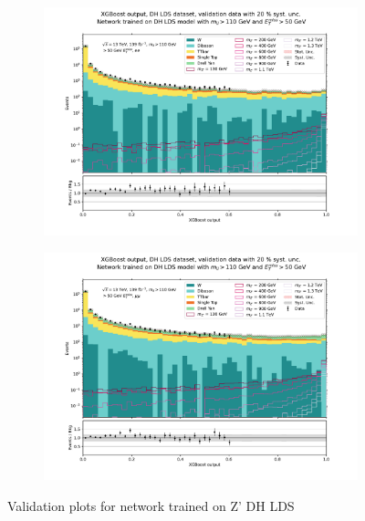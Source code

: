 \documentclass[12pt, a4paper]{book}
\begin{document}
\begin{figure}[!ht]
	\centering
	\begin{subfigure}[b]{0.49\textwidth}
      \centering
      \includegraphics[width=1\textwidth]{XGBoost/DH_LDS/VAL_ee.pdf}
      \end{subfigure}
   \hfill
   \begin{subfigure}[b]{0.49\textwidth}
      \centering
      \includegraphics[width=1\textwidth]{XGBoost/DH_LDS/VAL_uu.pdf}
      \end{subfigure}
   \caption{Validation plots for network trained on Z' DH LDS}\label{fig:DH_LDS_vals}
\end{figure}
\end{document}
